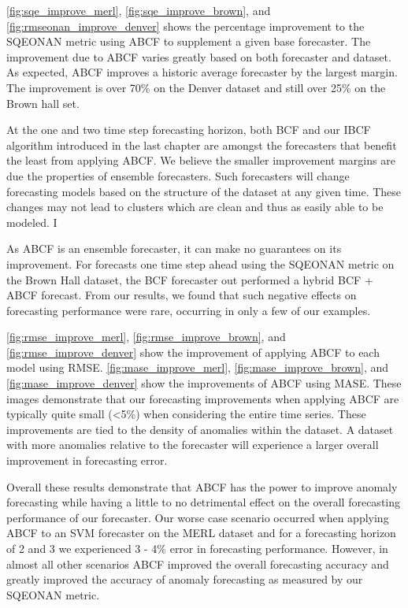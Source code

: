 \ref{fig:sqe_improve_merl}, \ref{fig:sqe_improve_brown}, and \ref{fig:rmseonan_improve_denver} shows the percentage improvement to the SQEONAN metric using ABCF to supplement a given base forecaster.  The improvement due to ABCF varies greatly based on both forecaster and dataset.  As expected, ABCF improves a historic average forecaster by the largest margin.  The improvement is over 70\% on the Denver dataset and still over 25\% on the Brown hall set.

At the one and two time step forecasting horizon, both BCF and our IBCF algorithm introduced in the last chapter are amongst the forecasters that benefit the least from applying ABCF.  We believe the smaller improvement margins are due the properties of ensemble forecasters.  Such forecasters will change forecasting models based on the structure of the dataset at any given time.  These changes may not lead to clusters which are clean and thus as easily able to be modeled.  I

As ABCF is an ensemble forecaster, it can make no guarantees on its improvement.  For forecasts one time step ahead using the SQEONAN metric on the Brown Hall dataset, the BCF forecaster out performed a hybrid BCF + ABCF forecast.  From our results, we found that such negative effects on forecasting performance were rare, occurring in only a few of our examples.

\ref{fig:rmse_improve_merl}, \ref{fig:rmse_improve_brown}, and \ref{fig:rmse_improve_denver} show the improvement of applying ABCF to each model using RMSE. \ref{fig:mase_improve_merl}, \ref{fig:mase_improve_brown}, and \ref{fig:mase_improve_denver} show the improvements of ABCF using MASE.  These images demonstrate that our forecasting improvements when applying ABCF are typically quite small (<5\%) when considering the entire time series.  These improvements are tied to the density of anomalies within the dataset.  A dataset with more anomalies relative to the forecaster will experience a larger overall improvement in forecasting error.

Overall these results demonstrate that ABCF has the power to improve anomaly forecasting while having a little to no detrimental effect on the overall forecasting performance of our forecaster.  Our worse case scenario occurred when applying ABCF to an SVM forecaster on the MERL dataset and for a forecasting horizon of 2 and 3 we experienced 3 - 4\% error in forecasting performance.  However, in almost all other scenarios ABCF improved the overall forecasting accuracy and greatly improved the accuracy of anomaly forecasting as measured by our SQEONAN metric.

